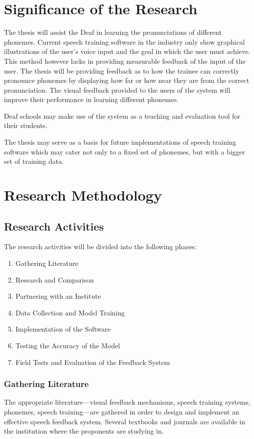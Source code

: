 
\section{Significance of the Research}
\label{sec:significance}

The thesis will assist the Deaf in learning the pronunciations of different phonemes. Current speech training software in the industry only show graphical illustrations of the user's voice input and the goal in which the user must achieve. This method however lacks in providing measurable feedback of the input of the user. The thesis will be providing feedback as to how the trainee can correctly pronounce phonemes by displaying how far or how near they are from the correct pronunciation. The visual feedback provided to the users of the system will improve their performance in learning different phonemes.

Deaf schools may make use of the system as a teaching and evaluation tool for their students.

The thesis may serve as a basis for future implementations of speech training software which may cater not only to a fixed set of phonemes, but with a bigger set of training data.

\section{Research Methodology}
\label{sec:methodology}

\subsection{Research Activities}
The research activities will be divided into the following phases:
\begin{enumerate}
\item Gathering Literature
\item Research and Comparison
\item Partnering with an Institute
\item Data Collection and Model Training
\item Implementation of the Software
\item Testing the Accuracy of the Model
\item Field Tests and Evaluation of the Feedback System
\end{enumerate}

\subsubsection{Gathering Literature}
The appropriate literature---visual feedback mechanisms, speech training systems, phonemes, speech training---are gathered in order to design and implement an effective speech feedback system. Several textbooks and journals are available in the institution where the proponents are studying in.

